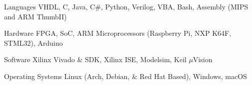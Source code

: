 
\begin{cvskills}
	\cvskill
	{Languages}
	{VHDL, C, Java, C\#, Python, Verilog, VBA, Bash, Assembly (MIPS and ARM ThumbII)}

	\cvskill
	{Hardware}
	{FPGA, SoC, ARM Microprocessors (Raspberry Pi, NXP K64F, STML32), Arduino}

	\cvskill
	{Software}
	{Xilinx Vivado \& SDK, Xilinx ISE, Modelsim, Keil $\mu$Vision}

	\cvskill
	{Operating Systems}
	{Linux (Arch, Debian, \& Red Hat Based), Windows, macOS}

\end{cvskills}
